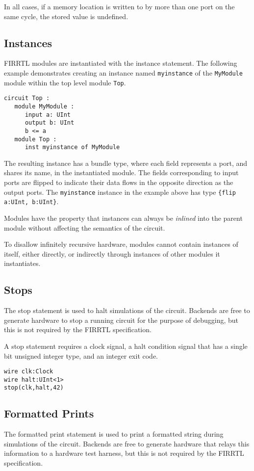 \documentclass[12pt]{article}
\begin{document}
In all cases, if a memory location is written to by more than one port on the same cycle, the stored value is undefined.

\subsection{Instances}
FIRRTL modules are instantiated with the instance statement. The following example demonstrates creating an instance named \verb|myinstance| of the \verb|MyModule| module within the top level module \verb|Top|. 

\begin{verbatim}
circuit Top :
   module MyModule :
      input a: UInt
      output b: UInt
      b <= a
   module Top :
      inst myinstance of MyModule   
\end{verbatim}

The resulting instance has a bundle type, where each field represents a port, and shares its name, in the instantiated module. The fields corresponding to input ports are flipped to indicate their data flows in the opposite direction as the output ports. The \verb|myinstance| instance in the example above has type \verb|{flip a:UInt, b:UInt}|.

Modules have the property that instances can always be {\em inlined} into the parent module without affecting the semantics of the circuit.

To disallow infinitely recursive hardware, modules cannot contain instances of itself, either directly, or indirectly through instances of other modules it instantiates. 

\subsection{Stops}
The stop statement is used to halt simulations of the circuit. Backends are free to generate hardware to stop a running circuit for the purpose of debugging, but this is not required by the FIRRTL specification.

A stop statement requires a clock signal, a halt condition signal that has a single bit unsigned integer type, and an integer exit code.

\begin{verbatim}
wire clk:Clock
wire halt:UInt<1>
stop(clk,halt,42)
\end{verbatim}

\subsection{Formatted Prints}
The formatted print statement is used to print a formatted string during simulations of the circuit. Backends are free to generate hardware that relays this information to a hardware test harness, but this is not required by the FIRRTL specification.
\end{document}
